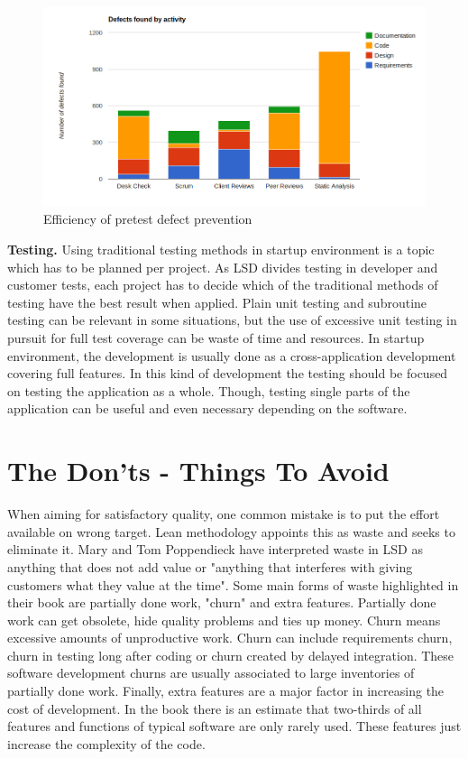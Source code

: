 \begin{figure}[t]
\begin{center}
\includegraphics[width=1.0\textwidth]{image/pretest-efficiency.png}
\end{center}
\caption{Efficiency of pretest defect prevention}
\label{fig:pretest-efficiency}
\end{figure}


\textbf{Testing.} Using traditional testing methods in startup environment is a topic which has to be planned per project. As LSD divides testing in developer and customer tests, each project has to decide which of the traditional methods of testing have the best result when applied. Plain unit testing and subroutine testing can be relevant in some situations, but the use of excessive unit testing in pursuit for full test coverage can be waste of time and resources. In startup environment, the development is usually done as a cross-application development covering full features. In this kind of development the testing should be focused on testing the application as a whole. Though, testing single parts of the application can be useful and even necessary depending on the software.

\section{The Don'ts - Things To Avoid}

When aiming for satisfactory quality, one common mistake is to put the effort available on wrong target. Lean methodology appoints this as waste and seeks to eliminate it. Mary and Tom Poppendieck have interpreted waste in LSD as anything that does not add value or "anything that interferes with giving customers what they value at the time". Some main forms of waste highlighted in their book are partially done work, "churn" and extra features. Partially done work can get obsolete, hide quality problems and ties up money. Churn means excessive amounts of unproductive work. Churn can include requirements churn, churn in testing long after coding or churn created by delayed integration. These software development churns are usually associated to large inventories of partially done work. Finally, extra features are a major factor in increasing the cost of development. In the book there is an estimate that two-thirds of all features and functions of typical software are only rarely used. These features just increase the complexity of the code.~\cite{poppendieck2006implementing} 

